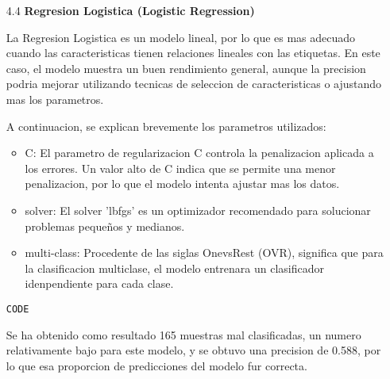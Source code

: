 \documentclass{article}
\begin{document}
\begin{itemize}

\item[4.4]  {\bf Regresion Logistica (Logistic Regression)}

La Regresion Logistica es un modelo lineal, por lo que es mas adecuado cuando las caracteristicas tienen relaciones lineales con las etiquetas. En este caso, el modelo muestra un buen rendimiento general, aunque la precision podria mejorar utilizando tecnicas de seleccion de caracteristicas o ajustando mas los parametros.

A continuacion, se explican brevemente los parametros utilizados:

\begin{itemize}

\item
C: El parametro de regularizacion C controla la penalizacion aplicada a los errores. Un valor alto de C indica que se permite una menor penalizacion, por lo que el modelo intenta ajustar mas los datos.

\item
solver: El solver 'lbfgs' es un optimizador recomendado para solucionar problemas pequeños y medianos.

\item
multi-class: Procedente de las siglas OnevsRest (OVR), significa que para la
clasificacion multiclase, el modelo entrenara un clasificador idenpendiente para cada 
clase.

\end{itemize}

\begin{tcolorbox}[width=14cm]
\begin{scriptsize}
\begin{verbatim}
CODE
\end{verbatim}
\end{scriptsize}
\end{tcolorbox}

Se ha obtenido como resultado 165 muestras mal clasificadas, un numero relativamente bajo para este modelo, y se obtuvo una precision de 0.588, por lo que esa proporcion de  predicciones del modelo fur correcta.

\end{itemize}

\bigskip
\end{document}
